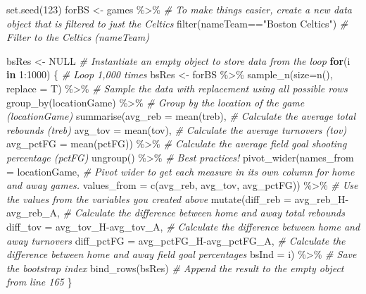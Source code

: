\documentclass[
]{article}
\newenvironment{Shaded}{\begin{snugshade}}{\end{snugshade}}
\newcommand{\AttributeTok}[1]{\textcolor[rgb]{0.77,0.63,0.00}{#1}}
\newcommand{\CommentTok}[1]{\textcolor[rgb]{0.56,0.35,0.01}{\textit{#1}}}
\newcommand{\ConstantTok}[1]{\textcolor[rgb]{0.00,0.00,0.00}{#1}}
\newcommand{\ControlFlowTok}[1]{\textcolor[rgb]{0.13,0.29,0.53}{\textbf{#1}}}
\newcommand{\DecValTok}[1]{\textcolor[rgb]{0.00,0.00,0.81}{#1}}
\newcommand{\FunctionTok}[1]{\textcolor[rgb]{0.00,0.00,0.00}{#1}}
\newcommand{\NormalTok}[1]{#1}
\newcommand{\OtherTok}[1]{\textcolor[rgb]{0.56,0.35,0.01}{#1}}
\newcommand{\SpecialCharTok}[1]{\textcolor[rgb]{0.00,0.00,0.00}{#1}}
\newcommand{\StringTok}[1]{\textcolor[rgb]{0.31,0.60,0.02}{#1}}
\begin{document}
\begin{Shaded}
\begin{Highlighting}[]
\FunctionTok{set.seed}\NormalTok{(}\DecValTok{123}\NormalTok{)}
\NormalTok{forBS }\OtherTok{\textless{}{-}}\NormalTok{ games }\SpecialCharTok{\%\textgreater{}\%} \CommentTok{\# To make things easier, create a new data object that is filtered to just the Celtics}
    \FunctionTok{filter}\NormalTok{(nameTeam}\SpecialCharTok{==}\StringTok{"Boston Celtics"}\NormalTok{) }\CommentTok{\# Filter to the Celtics (nameTeam)}

\NormalTok{bsRes }\OtherTok{\textless{}{-}} \ConstantTok{NULL} \CommentTok{\# Instantiate an empty object to store data from the loop}
\ControlFlowTok{for}\NormalTok{(i }\ControlFlowTok{in} \DecValTok{1}\SpecialCharTok{:}\DecValTok{1000}\NormalTok{) \{ }\CommentTok{\# Loop 1,000 times}
\NormalTok{  bsRes }\OtherTok{\textless{}{-}}\NormalTok{ forBS }\SpecialCharTok{\%\textgreater{}\%}
    \FunctionTok{sample\_n}\NormalTok{(}\AttributeTok{size=}\FunctionTok{n}\NormalTok{(), }\AttributeTok{replace =}\NormalTok{ T) }\SpecialCharTok{\%\textgreater{}\%} \CommentTok{\# Sample the data with replacement using all possible rows}
    \FunctionTok{group\_by}\NormalTok{(locationGame) }\SpecialCharTok{\%\textgreater{}\%} \CommentTok{\# Group by the location of the game (locationGame)}
    \FunctionTok{summarise}\NormalTok{(}\AttributeTok{avg\_reb =} \FunctionTok{mean}\NormalTok{(treb), }\CommentTok{\# Calculate the average total rebounds (treb)}
              \AttributeTok{avg\_tov =} \FunctionTok{mean}\NormalTok{(tov), }\CommentTok{\# Calculate the average turnovers (tov)}
              \AttributeTok{avg\_pctFG =} \FunctionTok{mean}\NormalTok{(pctFG)) }\SpecialCharTok{\%\textgreater{}\%} \CommentTok{\# Calculate the average field goal shooting percentage (pctFG)}
    \FunctionTok{ungroup}\NormalTok{() }\SpecialCharTok{\%\textgreater{}\%} \CommentTok{\# Best practices!}
    \FunctionTok{pivot\_wider}\NormalTok{(}\AttributeTok{names\_from =}\NormalTok{ locationGame, }\CommentTok{\# Pivot wider to get each measure in its own column for home and away games.}
                \AttributeTok{values\_from =} \FunctionTok{c}\NormalTok{(avg\_reb, avg\_tov, avg\_pctFG)) }\SpecialCharTok{\%\textgreater{}\%} \CommentTok{\# Use the values from the variables you created above}
    \FunctionTok{mutate}\NormalTok{(}\AttributeTok{diff\_reb =}\NormalTok{ avg\_reb\_H}\SpecialCharTok{{-}}\NormalTok{avg\_reb\_A, }\CommentTok{\# Calculate the difference between home and away total rebounds}
           \AttributeTok{diff\_tov =}\NormalTok{ avg\_tov\_H}\SpecialCharTok{{-}}\NormalTok{avg\_tov\_A, }\CommentTok{\# Calculate the difference between home and away turnovers}
           \AttributeTok{diff\_pctFG =}\NormalTok{ avg\_pctFG\_H}\SpecialCharTok{{-}}\NormalTok{avg\_pctFG\_A, }\CommentTok{\# Calculate the difference between home and away field goal percentages}
           \AttributeTok{bsInd =}\NormalTok{ i) }\SpecialCharTok{\%\textgreater{}\%} \CommentTok{\# Save the bootstrap index}
    \FunctionTok{bind\_rows}\NormalTok{(bsRes) }\CommentTok{\# Append the result to the empty object from line 165}
\NormalTok{\} }


\end{Highlighting}
\end{Shaded}
\end{document}
